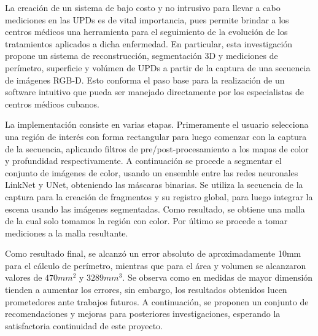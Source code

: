 \begin{conclusions}

La creación de un sistema de bajo costo y no intrusivo para llevar a cabo mediciones en las UPDs es de vital importancia, pues permite brindar a los centros médicos una herramienta para el seguimiento de la evolución de los tratamientos aplicados a dicha enfermedad. En particular, esta investigación propone un sistema de reconstrucción, segmentación 3D y mediciones de perímetro, superficie y volúmen de UPDs a partir de la captura de una secuencia de imágenes RGB-D. Esto conforma el paso base para la realización de un software intuitivo que pueda ser manejado directamente por los especialistas de centros médicos cubanos.

La implementación consiste en varias etapas. Primeramente el usuario selecciona una región de interés con forma rectangular para luego comenzar con la captura de la secuencia, aplicando filtros de pre/post-procesamiento a los mapas de color y profundidad respectivamente. A continuación se procede a segmentar el conjunto de imágenes de color, usando un ensemble entre las redes neuronales LinkNet y UNet, obteniendo las máscaras binarias. Se utiliza la secuencia de la captura para la creación de fragmentos y su registro global, para luego integrar la escena usando las imágenes segmentadas. Como resultado, se obtiene una malla de la cual solo tomamos la región con color. Por último se procede a tomar mediciones a la malla resultante.

Como resultado final, se alcanzó un error absoluto de aproximadamente 10mm para el cálculo de perímetro, mientras que para el área y volumen se alcanzaron valores de $470mm^2$ y $3289mm^3$. Se observa como en medidas de mayor dimensión tienden a aumentar los errores, sin embargo, los resultados obtenidos lucen prometedores ante trabajos futuros. A continuación, se proponen un conjunto de recomendaciones y mejoras para posteriores investigaciones, esperando la satisfactoria continuidad de este proyecto.
\end{conclusions}
